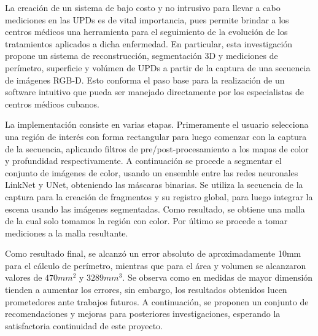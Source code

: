 \begin{conclusions}

La creación de un sistema de bajo costo y no intrusivo para llevar a cabo mediciones en las UPDs es de vital importancia, pues permite brindar a los centros médicos una herramienta para el seguimiento de la evolución de los tratamientos aplicados a dicha enfermedad. En particular, esta investigación propone un sistema de reconstrucción, segmentación 3D y mediciones de perímetro, superficie y volúmen de UPDs a partir de la captura de una secuencia de imágenes RGB-D. Esto conforma el paso base para la realización de un software intuitivo que pueda ser manejado directamente por los especialistas de centros médicos cubanos.

La implementación consiste en varias etapas. Primeramente el usuario selecciona una región de interés con forma rectangular para luego comenzar con la captura de la secuencia, aplicando filtros de pre/post-procesamiento a los mapas de color y profundidad respectivamente. A continuación se procede a segmentar el conjunto de imágenes de color, usando un ensemble entre las redes neuronales LinkNet y UNet, obteniendo las máscaras binarias. Se utiliza la secuencia de la captura para la creación de fragmentos y su registro global, para luego integrar la escena usando las imágenes segmentadas. Como resultado, se obtiene una malla de la cual solo tomamos la región con color. Por último se procede a tomar mediciones a la malla resultante.

Como resultado final, se alcanzó un error absoluto de aproximadamente 10mm para el cálculo de perímetro, mientras que para el área y volumen se alcanzaron valores de $470mm^2$ y $3289mm^3$. Se observa como en medidas de mayor dimensión tienden a aumentar los errores, sin embargo, los resultados obtenidos lucen prometedores ante trabajos futuros. A continuación, se proponen un conjunto de recomendaciones y mejoras para posteriores investigaciones, esperando la satisfactoria continuidad de este proyecto.
\end{conclusions}
